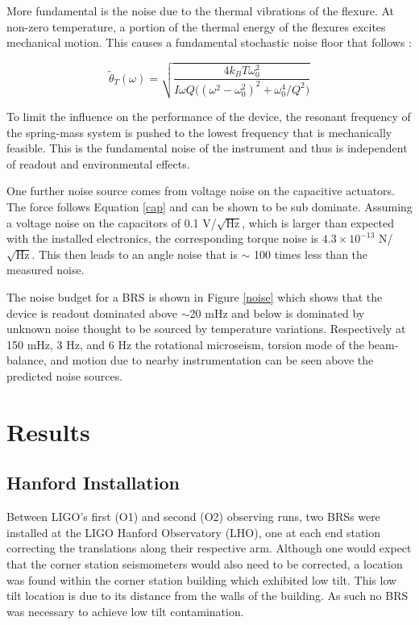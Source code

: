 \documentclass [12pt, proquest]{uwthesis}[2019]
\begin{document}
More fundamental is the noise due to the thermal vibrations of the flexure. At non-zero temperature, a portion of the thermal energy of the flexures excites mechanical motion. This causes a fundamental stochastic noise floor that follows \cite{thermal}:

\begin{equation}
\tilde\theta_T(\omega)=\sqrt{\frac{4 k_B T \omega_0^2}{I \omega Q\big((\omega^2-\omega_0^2)^2+\omega_0^4/Q^2\big)}}
\end{equation}

To limit the influence on the performance of the device, the resonant frequency of the spring-mass system is pushed to the lowest frequency that is mechanically feasible. This is the fundamental noise of the instrument and thus is independent of readout and environmental effects.

 One further noise source comes from voltage noise on the capacitive actuators. The force follows Equation \ref{cap} and can be shown to be sub dominate. Assuming a voltage noise on the capacitors of 0.1 V/$\sqrt{\text{Hz}}$, which is larger than expected with the installed electronics, the corresponding torque noise is $4.3 \times 10^{-13}$ N/$\sqrt{\text{Hz}}$. This then leads to an angle noise that is $\sim$ 100 times less than the measured noise.

 The noise budget for a BRS is shown in Figure \ref{noise} which shows that the device is readout dominated above $\sim$20 mHz and below is dominated by unknown noise thought to be sourced by temperature variations. Respectively at 150 mHz, 3 Hz, and 6 Hz the rotational microseism, torsion mode of the beam-balance, and motion due to nearby instrumentation can be seen above the predicted noise sources.

\section{Results}\label{results}
\subsection{Hanford Installation} \label{BRS_Hanford}

\quad Between LIGO's first (O1) and second (O2) observing runs, two BRSs were installed at the LIGO Hanford Observatory (LHO), one at each end station correcting the translations along their respective arm. Although one would expect that the corner station seismometers would also need to be corrected, a location was found within the corner station building which exhibited low tilt. This low tilt location is due to its distance from the walls of the building. As such no BRS was necessary to achieve low tilt contamination.
\end{document}
